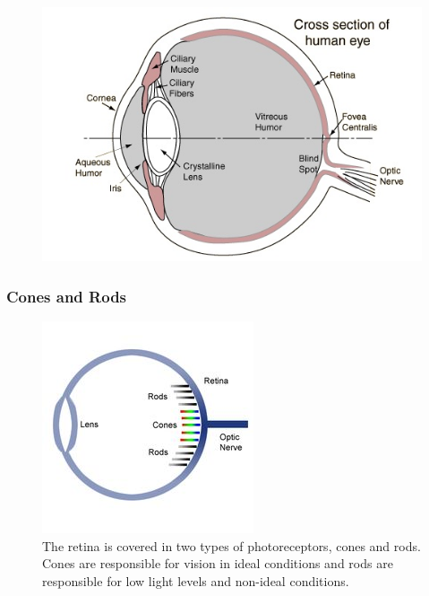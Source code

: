 \begin{frame}
	\begin{figure}
		\includegraphics[scale=.6]{assets/eye} 
		\caption{}
	\end{figure}
\end{frame}

\begin{frame}
	\frametitle{Cones and Rods}
	\begin{figure}
		\includegraphics[scale=.5]{assets/cones-rods.jpg}
		\caption{ The retina is covered in two types of photoreceptors, cones and rods. Cones are responsible for vision in ideal conditions and rods are responsible for low light levels and non-ideal conditions. }
	\end{figure}
\end{frame}


